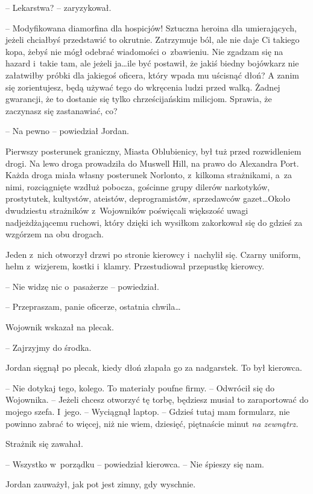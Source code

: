 \documentclass[oneside,polish,11pt,sfheadings]{mwbk}
\begin{document}
-- Lekarstwa? -- zaryzykował.

-- Modyfikowana diamorfina dla hospicjów! Sztuczna heroina dla
umierających, jeżeli chciałbyś przedstawić to okrutnie. Zatrzymuje ból,
ale nie daje Ci takiego kopa, żebyś nie mógł odebrać wiadomości o~zbawieniu. Nie zgadzam się na hazard i~takie tam, ale jeżeli ja\ldots ile
być postawił, że jakiś biedny bojówkarz nie załatwiłby próbki dla
jakiegoś oficera, który wpada mu uścisnąć dłoń? A zanim się
zorientujesz, będą używać tego do wkręcenia ludzi przed walką. Żadnej
gwarancji, że to dostanie się tylko chrześcijańskim milicjom. Sprawia,
że zaczynasz się zastanawiać, co?

-- Na pewno -- powiedział Jordan.

Pierwszy posterunek graniczny, Miasta Oblubienicy, był tuż przed
rozwidleniem drogi. Na lewo droga prowadziła do Muswell Hill, na prawo
do Alexandra Port. Każda droga miała własny posterunek Norlonto, z~kilkoma strażnikami, a~za nimi, rozciągnięte wzdłuż pobocza, gościnne
grupy dilerów narkotyków, prostytutek, kultystów, ateistów,
deprogramistów, sprzedawców gazet\ldots Około dwudziestu strażników z~Wojowników poświęcali większość uwagi nadjeżdżającemu ruchowi, który
dzięki ich wysiłkom zakorkował się do gdzieś za wzgórzem na obu drogach.

Jeden z~nich otworzył drzwi po stronie kierowcy i~nachylił się. Czarny
uniform, hełm z~wizjerem, kostki i~klamry. Przestudiował przepustkę
kierowcy.

-- Nie widzę nic o~pasażerze -- powiedział.

-- Przepraszam, panie oficerze, ostatnia chwila\ldots

Wojownik wskazał na plecak.

-- Zajrzyjmy do środka.

Jordan sięgnął po plecak, kiedy dłoń złapała go za nadgarstek. To był
kierowca.

-- Nie dotykaj tego, kolego. To materiały poufne firmy. -- Odwrócił się do
Wojownika. -- Jeżeli chcesz otworzyć tę torbę, będziesz musiał to
zaraportować do mojego szefa. I~jego. -- Wyciągnął laptop. -- Gdzieś tutaj
mam formularz, nie powinno zabrać to więcej, niż nie wiem, dziesięć,
piętnaście minut \emph{na zewnątrz.}

Strażnik się zawahał.

-- Wszystko w~porządku -- powiedział kierowca. -- Nie śpieszy się nam.

Jordan zauważył, jak pot jest zimny, gdy wyschnie.
\end{document}
